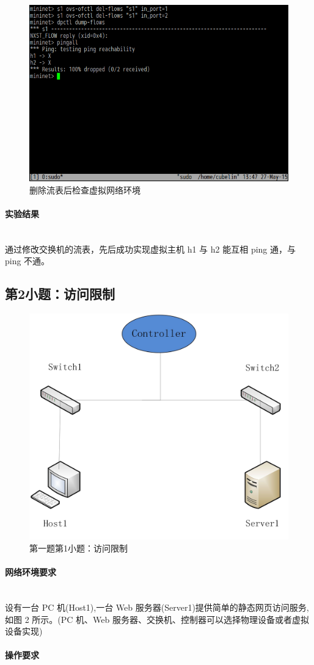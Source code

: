 \documentclass[format=draft,language=chinese,category=SDN]{hustreport}
\newcommand{\myparagraph}[1]{\paragraph{#1}\mbox{}\\}
\begin{document}
\begin{figure}[!h]
\centering
\includegraphics[width=.618\textwidth]{fig/1_1-2.png}
\caption{删除流表后检查虚拟网络环境}\label{fig:Q1_1-2}
\end{figure}

\myparagraph{实验结果}

通过修改交换机的流表，先后成功实现虚拟主机 h1 与 h2 能互相 ping 通，与 ping 不通。

\clearpage

\subsection{第2小题：访问限制}\label{sec:Q1_2}

\begin{figure}[!h]
\centering
\includegraphics[width=.618\textwidth]{fig/1_2-0.png}
\caption{第一题第1小题：访问限制}\label{fig:Q1_2-0}
\end{figure}

\myparagraph{网络环境要求}

设有一台 PC 机(Host1),一台 Web 服务器(Server1)提供简单的静态网页访问服务,如图 2 所示。(PC 机、Web 服务器、交换机、控制器可以选择物理设备或者虚拟设备实现)

\myparagraph{操作要求}
\end{document}
